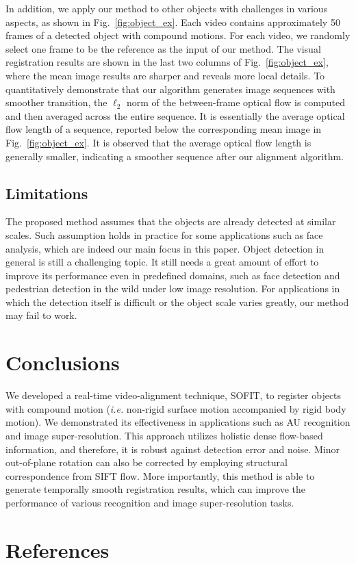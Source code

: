 \documentclass[review]{elsarticle}
\begin{document}
In addition, we apply our method to other objects with challenges in various aspects, as shown in Fig.~\ref{fig:object_ex}. Each video contains approximately 50 frames of a detected object with compound motions. For each video, we randomly select one frame to be the reference as the input of our method. The visual registration results are shown in the last two columns of Fig.~\ref{fig:object_ex}, where the mean image results are sharper and reveals more local details. To quantitatively demonstrate that our algorithm generates image sequences with smoother transition, the $\ell_2$ norm of the between-frame optical flow is computed and then averaged across the entire sequence. It is essentially the average optical flow length of a sequence, reported below the corresponding mean image in Fig.~\ref{fig:object_ex}. It is observed that the average optical flow length is generally smaller, indicating a smoother sequence after our alignment algorithm.

\subsection{Limitations}
The proposed method assumes that the objects are already detected at similar scales. Such assumption holds in practice for some applications such as face analysis, which are indeed our main focus in this paper. Object detection in general is still a challenging topic. It still needs a great amount of effort to improve its performance even in predefined domains, such as face detection and pedestrian detection in the wild under low image resolution. For applications in which the detection itself is difficult or the object scale varies greatly, our method may fail to work.


\section{Conclusions\label{sec:conclusion}}

We developed a real-time video-alignment technique, SOFIT, to register objects with compound motion (\textit{i.e.} non-rigid surface motion accompanied by rigid body motion). We demonstrated its effectiveness in applications such as AU recognition and image super-resolution. This approach utilizes holistic dense flow-based information, and therefore, it is robust against detection error and noise. Minor out-of-plane rotation can also be corrected by employing structural correspondence from SIFT flow. More importantly, this method is able to generate temporally smooth registration results, which can improve the performance of various recognition and image super-resolution tasks.

\section*{References}


\end{document}
